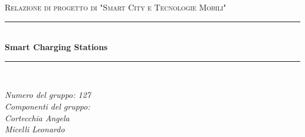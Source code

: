 \documentclass[12pt]{article}
\begin{document}

\begin{titlepage}

  \newcommand{\HRule}{\rule{\linewidth}{0.5mm}}

  \center

  \textsc{\Large Relazione di progetto di "Smart City e Tecnologie Mobili"}\\[0.5cm]

  \HRule \\[0.4cm]
  { \huge \bfseries Smart Charging Stations}\\[0.4cm]
  \HRule \\[1.5cm]

  \vfill

  \begin{flushleft}
    \emph{Numero del gruppo: 127}\\[1cm]
    \emph{Componenti del gruppo:\\Cortecchia Angela\\Micelli Leonardo}\\[3cm]

  \end{flushleft}


\end{titlepage}


\tableofcontents

\newpage













\end{document}
